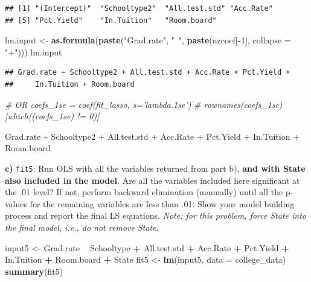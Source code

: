 \documentclass[]{article}
\newenvironment{Shaded}{\begin{snugshade}}{\end{snugshade}}
\newcommand{\KeywordTok}[1]{\textcolor[rgb]{0.13,0.29,0.53}{\textbf{#1}}}
\newcommand{\DataTypeTok}[1]{\textcolor[rgb]{0.13,0.29,0.53}{#1}}
\newcommand{\DecValTok}[1]{\textcolor[rgb]{0.00,0.00,0.81}{#1}}
\newcommand{\StringTok}[1]{\textcolor[rgb]{0.31,0.60,0.02}{#1}}
\newcommand{\CommentTok}[1]{\textcolor[rgb]{0.56,0.35,0.01}{\textit{#1}}}
\newcommand{\OperatorTok}[1]{\textcolor[rgb]{0.81,0.36,0.00}{\textbf{#1}}}
\newcommand{\NormalTok}[1]{#1}
\begin{document}
\begin{verbatim}
## [1] "(Intercept)"  "Schooltype2"  "All.test.std" "Acc.Rate"    
## [5] "Pct.Yield"    "In.Tuition"   "Room.board"
\end{verbatim}

\begin{Shaded}
\begin{Highlighting}[]
\NormalTok{lm.input <-}\StringTok{ }\KeywordTok{as.formula}\NormalTok{(}\KeywordTok{paste}\NormalTok{(}\StringTok{"Grad.rate"}\NormalTok{, }\StringTok{"~"}\NormalTok{, }\KeywordTok{paste}\NormalTok{(nzcoef[}\OperatorTok{-}\DecValTok{1}\NormalTok{], }\DataTypeTok{collapse =} \StringTok{"+"}\NormalTok{)))}
\NormalTok{lm.input}
\end{Highlighting}
\end{Shaded}

\begin{verbatim}
## Grad.rate ~ Schooltype2 + All.test.std + Acc.Rate + Pct.Yield + 
##     In.Tuition + Room.board
\end{verbatim}

\begin{Shaded}
\begin{Highlighting}[]
\CommentTok{# OR coefs_1se = coef(fit_lasso, s='lambda.1se')}
\CommentTok{# rownames(coefs_1se)[which((coefs_1se) != 0)]}
\end{Highlighting}
\end{Shaded}

Grad.rate \textasciitilde{} Schooltype2 + All.test.std + Acc.Rate +
Pct.Yield + In.Tuition + Room.board

\textbf{c)} \texttt{fit5}: Run OLS with all the variables returned from
part b), \textbf{and with State also included in the model}. Are all the
variables included here significant at the .01 level? If not, perform
backward elimination (manually) until all the p-values for the remaining
variables are less than .01. Show your model building process and report
the final LS equations. \emph{Note: for this problem, force State into
the final model, i.e., do not remove State.}

\begin{Shaded}
\begin{Highlighting}[]
\NormalTok{input5 <-}\StringTok{ }\NormalTok{Grad.rate }\OperatorTok{~}\StringTok{ }\NormalTok{Schooltype }\OperatorTok{+}\StringTok{ }\NormalTok{All.test.std }\OperatorTok{+}\StringTok{ }\NormalTok{Acc.Rate }\OperatorTok{+}\StringTok{ }\NormalTok{Pct.Yield }\OperatorTok{+}\StringTok{ }\NormalTok{In.Tuition }\OperatorTok{+}\StringTok{ }
\StringTok{    }\NormalTok{Room.board }\OperatorTok{+}\StringTok{ }\NormalTok{State}
\NormalTok{fit5 <-}\StringTok{ }\KeywordTok{lm}\NormalTok{(input5, }\DataTypeTok{data =}\NormalTok{ college_data)}
\KeywordTok{summary}\NormalTok{(fit5)}
\end{Highlighting}
\end{Shaded}
\end{document}

